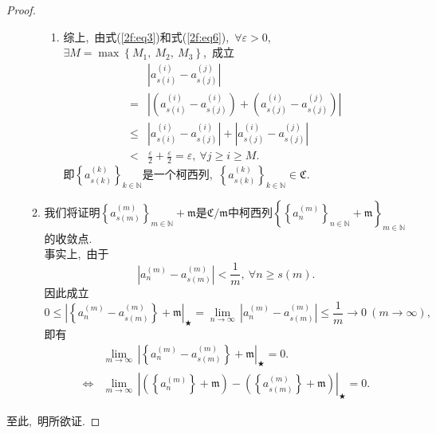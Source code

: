 \documentclass[UTF8, twoside]{ctexart}
\theoremstyle{nonumberplain}
\newtheorem{proof}{\heiti 证明}  %
\theoremstyle{nonumberplain}
\theoremstyle{plain}
\begin{document}
\begin{proof}
\begin{enumerate}
\begin{enumerate}
\begin{enumerate}
					\item 综上,\ 由式(\ref{2f:eq3})和式(\ref{2f:eq6}),\ $\forall \varepsilon >0$,\ $\exists M=\max \left\{ {{M}_{1}},\ {{M}_{2}},\ {{M}_{3}} \right\}$,\ 成立
					\begin{align*}
						& \left| a_{s\left( i \right)}^{\left( i \right)}-a_{s\left( j \right)}^{\left( j \right)} \right| \\ 
						=&\left| \left( a_{s\left( i \right)}^{\left( i \right)}-a_{s\left( j \right)}^{\left( i \right)} \right)+\left( a_{s\left( j \right)}^{\left( i \right)}-a_{s\left( j \right)}^{\left( j \right)} \right) \right| \\ 
						\le& \left| a_{s\left( i \right)}^{\left( i \right)}-a_{s\left( j \right)}^{\left( i \right)} \right|+\left| a_{s\left( j \right)}^{\left( i \right)}-a_{s\left( j \right)}^{\left( j \right)} \right| \\ 
						<&\frac{\varepsilon }{2}+\frac{\varepsilon }{2}=\varepsilon ,
						\ \forall j\ge i\ge M.  
					\end{align*}
					即${{\left\{ a_{s\left( k \right)}^{\left( k \right)} \right\}}_{k\in \mathbb{N}}}$是一个柯西列,\ ${{\left\{ a_{s\left( k \right)}^{\left( k \right)} \right\}}_{k\in \mathbb{N}}}\in \mathfrak{C}$.\ 
				\end{enumerate}
				\vskip 0.3cm
				
				\item 我们将证明${{\left\{ a_{s\left( m \right)}^{\left( m \right)} \right\}}_{m\in \mathbb{N}}}+\mathfrak{m}$是$\mathfrak{C}/\mathfrak{m}$中柯西列${{\left\{ {{\left\{ a_{n}^{\left( m \right)} \right\}}_{n\in \mathbb{N}}}+\mathfrak{m} \right\}}_{m\in \mathbb{N}}}$的收敛点.\ \\
				事实上,\ 由于
				\[
					\left| a_{n}^{\left( m \right)}-a_{s\left( m \right)}^{\left( m \right)} \right|<\frac{1}{m},\ \forall n\ge s\left( m \right).
				\]
				因此成立
				\[
					0\le {\left| \left\{ a_{n}^{\left( m \right)}-a_{s\left( m \right)}^{\left( m \right)} \right\}+\mathfrak{m} \right|_{\bigstar}}=\underset{n\to \infty }{\mathop{\lim }}\,\left| a_{n}^{\left( m \right)}-a_{s\left( m \right)}^{\left( m \right)} \right|\le \frac{1}{m}\to 0
					\ \left( m\to \infty  \right),
				\]
				即有
				\begin{align*}
				&\underset{m\to \infty }{\mathop{\lim }}\,{\left| \left\{ a_{n}^{\left( m \right)}-a_{s\left( m \right)}^{\left( m \right)} \right\}+\mathfrak{m} \right|}_{\bigstar}=0. \\
				\Longleftrightarrow& \underset{m\to \infty }{\mathop{\lim }}\,\left| \left( \left\{ a_{n}^{\left( m \right)} \right\}+\mathfrak{m} \right)-\left( \left\{ a_{s\left( m \right)}^{\left( m \right)} \right\}+\mathfrak{m} \right) \right|_{\bigstar}=0.
				\end{align*}
			\end{enumerate}
		\end{enumerate}
		\vskip 0.3cm
		至此,\ 明所欲证.
	\end{proof}
	
\end{document}
